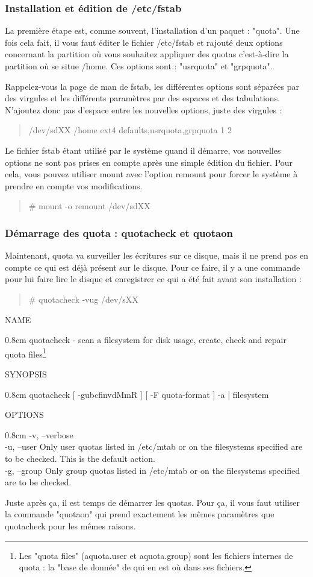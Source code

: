 \documentclass[a4paper,11pt]{article}
\newcommand{\commande}[1] {
    \begin{quote}
    \tt\raggedright #1
    \end{quote}
}
\newcommand{\man}[2]{
    \begin{tcolorbox}[toprule=3mm,width=\textwidth,outer arc=0mm,colbacktitle=grayman,coltitle=black,colback={grayman},colframe={grayman},title={man : \tt #1}]
        \tt\raggedright #2
    \end{tcolorbox}
}
\newcommand{\mandesc}[1]{
    \begin{adjustwidth}{0.8cm}{}
        #1
    \end{adjustwidth}
}
\begin{document}
\subsubsection{Installation et édition de /etc/fstab}
\par La première étape est, comme souvent, l'installation d'un paquet : "quota". Une fois cela fait, il vous faut éditer le fichier /etc/fstab et rajouté deux options concernant la partition où vous souhaitez appliquer des quotas c'est-à-dire la partition où se situe /home. Ces options sont : "usrquota" et "grpquota".
\par Rappelez-vous la page de man de fstab, les différentes options sont séparées par des virgules et les différents paramètres par des espaces et des tabulations. N'ajoutez donc pas d'espace entre les nouvelles options, juste des virgules :
\commande{/dev/sdXX /home ext4 defaults,usrquota,grpquota 1 2}
\par Le fichier fstab étant utilisé par le système quand il démarre, vos nouvelles options ne sont pas prises en compte après une simple édition du fichier. Pour cela, vous pouvez utiliser mount avec l'option remount pour forcer le système à prendre en compte vos modifications.
\commande{\# mount -o remount /dev/sdXX}

\subsubsection{Démarrage des quota : quotacheck et quotaon}
\par Maintenant, quota va surveiller les écritures sur ce disque, mais il ne prend pas en compte ce qui est déjà présent sur le disque. Pour ce faire, il y a une commande pour lui faire lire le disque et enregistrer ce qui a été fait avant son installation :
\commande{\# quotacheck -vug /dev/sXX}
\man{quotacheck}{NAME
\mandesc{quotacheck - scan a filesystem for disk usage, create, check and repair quota files\footnote{Les "quota files" (aquota.user et aquota.group) sont les fichiers internes de quota : la "base de donnée" de qui en est où dans ses fichiers.}}
SYNOPSIS
\mandesc{quotacheck [ -gubcfinvdMmR ] [ -F quota-format ] -a | filesystem}
OPTIONS
\mandesc{-v, --verbose\\
-u, --user Only user quotas listed in /etc/mtab or on the filesystems specified are to be checked.  This is the default action.\\
-g, --group Only group quotas listed in /etc/mtab or on the filesystems specified are to be checked.
}
}
\par Juste après ça, il est temps de démarrer les quotas. Pour ça, il vous faut utiliser la commande "quotaon" qui prend exactement les mêmes paramètres que quotacheck pour les mêmes raisons.
\end{document}
